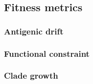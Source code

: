 \subsection*{Fitness metrics}

\subsubsection*{Antigenic drift}

\subsubsection*{Functional constraint}

\subsubsection*{Clade growth}
